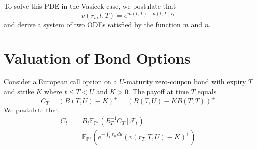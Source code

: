 \documentclass[10pt, oneside, reqno]{amsbook}
\theoremstyle{plain}%
\newtheorem{lem}[thm]{Lemma}
\theoremstyle{definition}
\theoremstyle{remark}
\newcommand{\var}{\text{Var}}
\newcommand{\given}{ \, | \,}
\newcommand{\sigf}{\mathcal{F}}
\newcommand{\E}{\mathbb{E}}
\renewcommand{\P}{\mathbb{P}}
\numberwithin{equation}{chapter}
\begin{document}
To solve this PDE in the Vasicek case, we postulate that \[
    v(r_t, t, T) = e^{m(t, T) - n(t, T) r_t}
\] and derive a system of two ODEs satisfied by the function $m$ and $n$. 



\section{Valuation of Bond Options} %
\label{sub:valuation_of_bond_optiosn}

Consider a European call option on a $U$-maturity zero-coupon bond with expiry $T$ and strike $K$ where $t \leq T < U$ and $K > 0$.  The payoff at time $T$ equals \[
    C_T = \left(B(T, U) - K \right)^+ = \left(B(T, U) - KB(T, T) \right)^+
\]  We postulate that \begin{align*}
    C_t     &= B_t \E_{\P^\star} \left(B_T^{-1} C_T \given \sigf_t \right) \\
            &= \E_{\P^\star} \left( e^{-\int_t^T r_u \, du} \left(v\left(r_T, T, U \right) - K\right)^+ \right) 
\end{align*}
\end{document}
